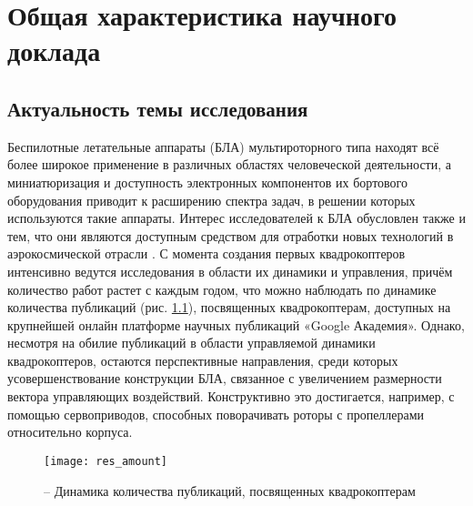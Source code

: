 
\chapter{Общая характеристика научного доклада}

\section{Актуальность темы исследования}

Беспилотные летательные аппараты (БЛА) мультироторного типа находят всё более широкое применение в различных областях человеческой деятельности, а миниатюризация и доступность электронных компонентов их бортового оборудования приводит к расширению спектра задач, в решении которых используются такие аппараты.
Интерес исследователей к БЛА обусловлен также и тем, что они являются доступным средством для отработки новых технологий в аэрокосмической отрасли \cite{Otero01}.
С момента создания первых квадрокоптеров интенсивно ведутся исследования в области их динамики и управления, причём количество работ растет с каждым годом, что можно наблюдать по динамике количества публикаций (рис. \ref{pic:res_amount}), посвященных квадрокоптерам, доступных на крупнейшей онлайн платформе научных публикаций «Google Академия».
Однако, несмотря на обилие публикаций в области управляемой динамики квадрокоптеров, остаются перспективные направления, среди которых усовершенствование конструкции БЛА, связанное с увеличением размерности вектора управляющих воздействий.
Конструктивно это достигается, например, с помощью сервоприводов, способных поворачивать роторы с пропеллерами относительно корпуса.
\begin{figure}[h!]
	\centering
	\texttt{[image: res\_amount]}
	\caption{ -- Динамика количества публикаций, посвященных квадрокоптерам}
	\label{pic:res_amount}
\end{figure}

